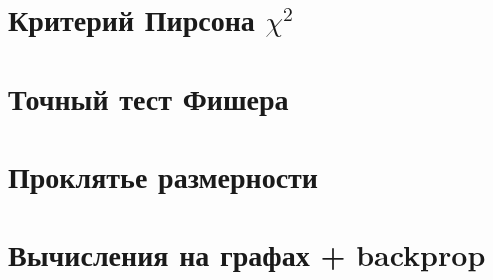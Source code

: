 \section{Критерий Пирсона $\chi^2$}


\section{Точный тест Фишера}


\section{Проклятье размерности}


\section{Вычисления на графах + backprop}


